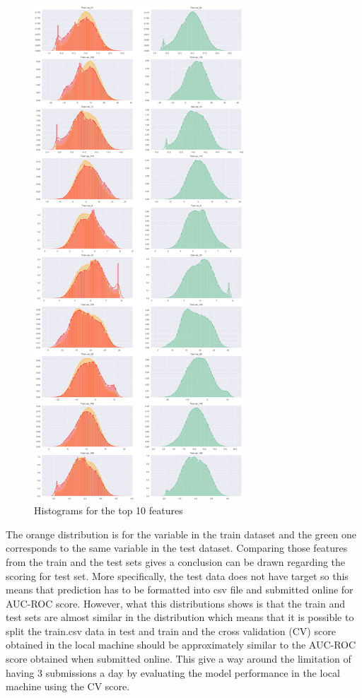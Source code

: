 \documentclass[journal,twoside,web]{ieeecolor}
\begin{document}
\begin{figure}[h!]
  \centering
  \includegraphics[width=3.1in]{project/code/Histograms-dist-of-features.png}
  \caption{Histograms for the top 10 features}
  \label{fig:fig4}
\end{figure}


The orange distribution is for the variable in the train dataset and the green one corresponds to the same variable in the test dataset. Comparing those features from the train and the test sets gives a conclusion can be drawn regarding the scoring for test set. More specifically, the test data does not have target so this means that prediction has to be formatted into csv file and submitted online for AUC-ROC score. However, what this distributions shows is that the train and test sets are almost similar in the distribution which means that it is possible to split the train.csv data in test and train and the cross validation (CV) score obtained in the local machine should be approximately similar to the AUC-ROC score obtained when submitted online. This give a way around the limitation of having 3 submissions a day by evaluating the model performance in the local machine using the CV score. 
\end{document}
